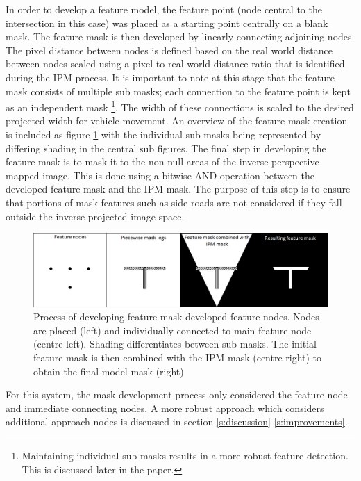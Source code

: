 \documentclass[]{aiaa-tc}%
\begin{document}
In order to develop a feature model, the feature point (node central to the intersection in this case) was placed as a starting point centrally on a blank mask. The feature mask is then developed by linearly connecting adjoining nodes. The pixel distance between nodes is defined based on the real world distance between nodes scaled using a pixel to real world distance ratio that is identified during the IPM process. It is important to note at this stage that the feature mask consists of multiple sub masks; each connection to the feature point is kept as an independent mask \footnote{Maintaining individual sub masks results in a more robust feature detection. This is discussed later in the paper.}. The width of these connections is scaled to the desired projected width for vehicle movement. An overview of the feature mask creation is included as figure \ref{f:featureMaskDevelopment} with the individual sub masks being represented by differing shading in the central sub figures. The final step in developing the feature mask is to mask it to the non-null areas of the inverse perspective mapped image. This is done using a bitwise AND operation between the developed feature mask and the IPM mask. The purpose of this step is to ensure that portions of mask features such as side roads are not considered if they fall outside the inverse projected image space. 

\begin{figure}
	\centering
	\includegraphics[width=1\textwidth]{FeatureMatching/featureMaskDevelopment.png}
	\caption{Process of developing feature mask developed feature nodes. Nodes are placed (left) and individually connected to main feature node (centre left). Shading differentiates between sub masks. The initial feature mask is then combined with the IPM mask (centre right) to obtain the final model mask (right)}
	\label{f:featureMaskDevelopment}
\end{figure}

For this system, the mask development process only considered the feature node and immediate connecting nodes. A more robust approach which considers additional approach nodes is discussed in section \ref{s:discussion}-\ref{s:improvements}.
\end{document}
